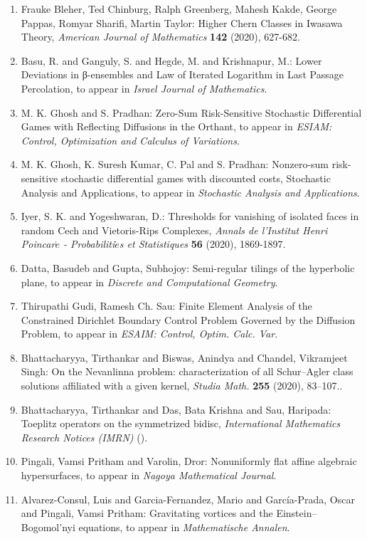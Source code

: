 \begin{enumerate}
\item Frauke Bleher, Ted Chinburg, Ralph Greenberg, Mahesh Kakde, George Pappas, Romyar Sharifi, Martin Taylor: Higher Chern Classes in Iwasawa Theory, \emph{American Journal of Mathematics} {\bf 142} (2020), 627-682.
\item Basu, R. and Ganguly, S. and Hegde, M. and Krishnapur, M.: Lower Deviations in β-ensembles and Law of Iterated Logarithm in Last Passage Percolation, to appear in \emph{Israel Journal of Mathematics}.
\item M. K. Ghosh and S. Pradhan: Zero-Sum Risk-Sensitive Stochastic Differential Games with Reflecting Diffusions in the Orthant, to appear in \emph{ESIAM: Control, Optimization and Calculus of Variations}.
\item M. K. Ghosh, K. Suresh Kumar, C. Pal and S. Pradhan: Nonzero-sum risk-sensitive stochastic differential games with discounted costs, Stochastic Analysis and Applications, to appear in \emph{Stochastic Analysis and Applications}.
\item Iyer, S. K. and Yogeshwaran, D.: Thresholds for vanishing of isolated faces in random Cech and Vietoris-Rips Complexes, \emph{Annals de l'Institut Henri Poincar$\acute{e}$ - Probabiliti$\acute{e}$s et Statistiques} {\bf 56} (2020), 1869-1897.
\item Datta, Basudeb and Gupta, Subhojoy: Semi-regular tilings of the hyperbolic plane, to appear in \emph{Discrete and Computational Geometry}.
\item Thirupathi Gudi, Ramesh Ch. Sau: Finite Element Analysis of the Constrained Dirichlet Boundary Control Problem Governed by the Diffusion Problem, to appear in \emph{ESAIM: Control, Optim. Calc. Var}.
\item Bhattacharyya, Tirthankar and Biswas, Anindya and Chandel, Vikramjeet Singh: On the Nevanlinna problem: characterization of all Schur–Agler class solutions affiliated with a given kernel, \emph{Studia Math.} {\bf 255} (2020), 83–107..
\item Bhattacharyya, Tirthankar and Das, Bata Krishna and Sau, Haripada: Toeplitz operators on the symmetrized bidisc, \emph{International Mathematics Research Notices (IMRN)} {\bf } ().
\item Pingali, Vamsi Pritham and Varolin, Dror: Nonuniformly flat affine algebraic hypersurfaces, to appear in \emph{Nagoya Mathematical Journal}.
\item Alvarez-Consul, Luis and Garcia-Fernandez, Mario  and García-Prada, Oscar and Pingali, Vamsi Pritham: Gravitating vortices and the Einstein–Bogomol’nyi equations, to appear in \emph{Mathematische Annalen}.

\end{enumerate}
